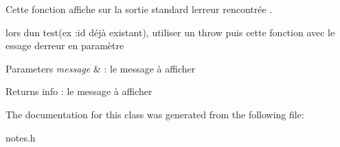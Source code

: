 Cette fonction affiche sur la sortie standard l\textquotesingle{}erreur rencontrée . 

lors d\textquotesingle{}un test(ex \+:id déjà existant), utiliser un throw puis cette fonction avec le essage d\textquotesingle{}erreur en paramètre 
\begin{DoxyParams}{Parameters}
{\em message} & \+: le message à afficher \\
\hline
\end{DoxyParams}
\begin{DoxyReturn}{Returns}
info \+: le message à afficher 
\end{DoxyReturn}


The documentation for this class was generated from the following file\+:\begin{DoxyCompactItemize}
\item 
notes.\+h\end{DoxyCompactItemize}
